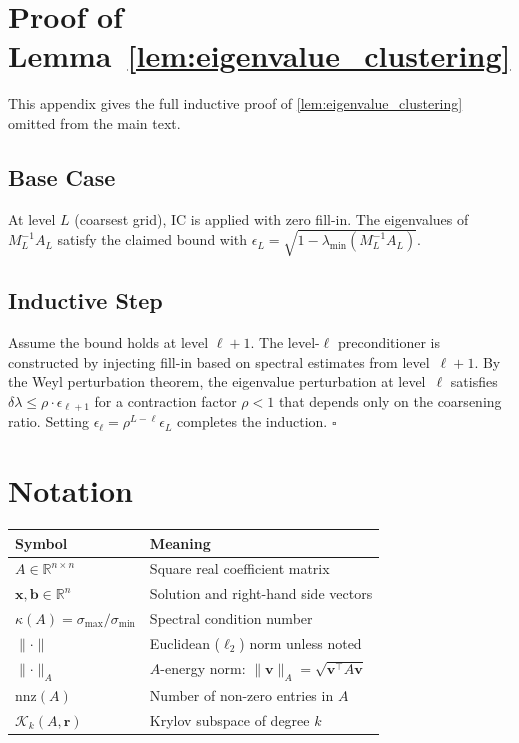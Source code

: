 \documentclass[
    12pt,
    a4paper,
    twoside,           %
    openright          %
]{book}
\newcommand{\R}{\mathbb{R}}           %
\newcommand{\norm}[1]{\lVert #1 \rVert}  %
\begin{document}
\appendix

\chapter{Proof of Lemma~\ref{lem:eigenvalue_clustering}}
\label{app:proof}

This appendix gives the full inductive proof of
\cref{lem:eigenvalue_clustering} omitted from the main text.

\section{Base Case}

At level $L$ (coarsest grid), IC is applied with zero fill-in.  The
eigenvalues of $M_L^{-1}A_L$ satisfy the claimed bound with
$\epsilon_L = \sqrt{1 - \lambda_{\min}(M_L^{-1}A_L)}$.

\section{Inductive Step}

Assume the bound holds at level $\ell+1$.  The level-$\ell$ preconditioner
is constructed by injecting fill-in based on spectral estimates from
level~$\ell+1$.  By the Weyl perturbation theorem, the eigenvalue
perturbation at level~$\ell$ satisfies $\delta\lambda \leq \rho \cdot
\epsilon_{\ell+1}$ for a contraction factor $\rho < 1$ that depends only
on the coarsening ratio.  Setting $\epsilon_\ell = \rho^{L-\ell}\epsilon_L$
completes the induction. \hfill$\square$

\chapter{Notation}
\label{app:notation}

\begin{center}
\begin{tabular}{ll}
\toprule
\textbf{Symbol} & \textbf{Meaning} \\
\midrule
$A \in \R^{n \times n}$     & Square real coefficient matrix \\
$\mathbf{x}, \mathbf{b} \in \R^n$ & Solution and right-hand side vectors \\
$\kappa(A) = \sigma_{\max}/\sigma_{\min}$ & Spectral condition number \\
$\norm{\cdot}$              & Euclidean ($\ell_2$) norm unless noted \\
$\norm{\cdot}_A$            & $A$-energy norm: $\norm{\mathbf{v}}_A = \sqrt{\mathbf{v}^\top A \mathbf{v}}$ \\
$\mathrm{nnz}(A)$           & Number of non-zero entries in $A$ \\
$\mathcal{K}_k(A,\mathbf{r})$ & Krylov subspace of degree $k$ \\
\bottomrule
\end{tabular}
\end{center}
\end{document}
